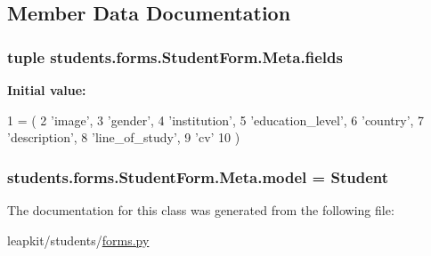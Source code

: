 \subsection{Member Data Documentation}
\hypertarget{classstudents_1_1forms_1_1_student_form_1_1_meta_ad8329dc8092a0ae452e6519cb0c8a520}{
\subsubsection[{fields}]{\setlength{\rightskip}{0pt plus 5cm}tuple students.\-forms.\-Student\-Form.\-Meta.\-fields\hspace{0.3cm}{\ttfamily [static]}}}\label{classstudents_1_1forms_1_1_student_form_1_1_meta_ad8329dc8092a0ae452e6519cb0c8a520}
{\bfseries Initial value\-:}
\begin{DoxyCode}
1 = (
2             \textcolor{stringliteral}{'image'},
3             \textcolor{stringliteral}{'gender'},
4             \textcolor{stringliteral}{'institution'},
5             \textcolor{stringliteral}{'education\_level'},
6             \textcolor{stringliteral}{'country'},
7             \textcolor{stringliteral}{'description'},
8             \textcolor{stringliteral}{'line\_of\_study'},
9             \textcolor{stringliteral}{'cv'}
10         )
\end{DoxyCode}
\hypertarget{classstudents_1_1forms_1_1_student_form_1_1_meta_a944b39a53a9423f8b62a08077e07db83}{
\subsubsection[{model}]{\setlength{\rightskip}{0pt plus 5cm}students.\-forms.\-Student\-Form.\-Meta.\-model = Student\hspace{0.3cm}{\ttfamily [static]}}}\label{classstudents_1_1forms_1_1_student_form_1_1_meta_a944b39a53a9423f8b62a08077e07db83}


The documentation for this class was generated from the following file\-:\begin{DoxyCompactItemize}
\item 
leapkit/students/\hyperlink{forms_8py}{forms.\-py}\end{DoxyCompactItemize}

